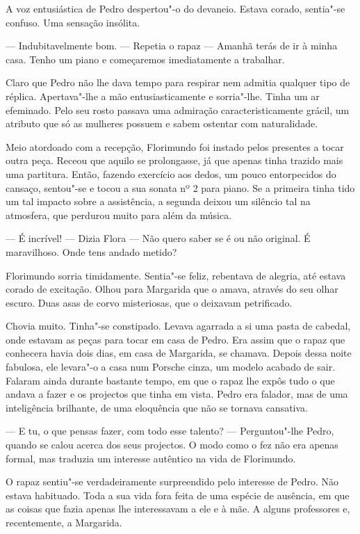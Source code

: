 A voz entusiástica de Pedro despertou"-o do devaneio. Estava corado,
sentia"-se confuso. Uma sensação insólita.

--- Indubitavelmente bom. --- Repetia o rapaz --- Amanhã terás de ir à minha
casa. Tenho um piano e começaremos imediatamente a trabalhar.

Claro que Pedro não lhe dava tempo para respirar nem admitia qualquer
tipo de réplica. Apertava"-lhe a mão entusiasticamente e sorria"-lhe.
Tinha um ar efeminado. Pelo seu rosto passava uma admiração
caracteristicamente grácil, um atributo que só as mulheres possuem e
sabem ostentar com naturalidade.

Meio atordoado com a recepção, Florimundo foi instado pelos presentes a
tocar outra peça. Receou que aquilo se prolongasse, já que apenas tinha
trazido mais uma partitura. Então, fazendo exercício aos dedos, um pouco
entorpecidos do cansaço, sentou"-se e tocou a sua sonata nº 2 para piano.
Se a primeira tinha tido um tal impacto sobre a assistência, a segunda
deixou um silêncio tal na atmosfera, que perdurou muito para além da
música.

--- É incrível! --- Dizia Flora --- Não quero saber se é ou não original. É
maravilhoso. Onde tens andado metido?

Florimundo sorria timidamente. Sentia"-se feliz, rebentava de alegria,
até estava corado de excitação. Olhou para Margarida que o amava,
através do seu olhar escuro. Duas asas de corvo misteriosas, que o
deixavam petrificado.

Chovia muito. Tinha"-se constipado. Levava agarrada a si uma pasta de
cabedal, onde estavam as peças para tocar em casa de Pedro. Era assim
que o rapaz que conhecera havia dois dias, em casa de Margarida, se
chamava. Depois dessa noite fabulosa, ele levara"-o a casa num Porsche
cinza, um modelo acabado de sair. Falaram ainda durante bastante tempo,
em que o rapaz lhe expôs tudo o que andava a fazer e os projectos que
tinha em vista. Pedro era falador, mas de uma inteligência brilhante, de
uma eloquência que não se tornava cansativa.

--- E tu, o que pensas fazer, com todo esse talento? --- Perguntou"-lhe
Pedro, quando se calou acerca dos seus projectos. O modo como o fez não
era apenas formal, mas traduzia um interesse autêntico na vida de
Florimundo.

O rapaz sentiu"-se verdadeiramente surpreendido pelo interesse de Pedro.
Não estava habituado. Toda a sua vida fora feita de uma espécie de
ausência, em que as coisas que fazia apenas lhe interessavam a ele e à
mãe. A alguns professores e, recentemente, a Margarida.

